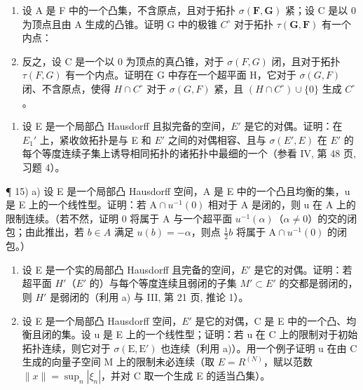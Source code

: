 \begin{enumerate}
\def\labelenumi{\alph{enumi})}
\item
  设 A 是 F 中的一个凸集，不含原点，且对于拓扑 \(\sigma(\mathbf{F}, \mathbf{G})\) 紧；设 C 是以 0 为顶点且由 A 生成的凸锥。证明 G 中的极锥 \(C^{\circ}\) 对于拓扑 \(\tau(\mathbf{G}, \mathbf{F})\) 有一个内点：
\item
  反之，设 C 是一个以 0 为顶点的真凸锥，对于 \(\sigma(F, G)\) 闭，且对于拓扑 \(\tau(F, G)\) 有一个内点。证明在 G 中存在一个超平面 H，它对于 \(\sigma(G, F)\) 闭、不含原点，使得 \(H \cap C^{\circ}\) 对于 \(\sigma(G, F)\) 紧，且 \((H \cap C^{\circ}) \cup \{0\}\) 生成 \(C^{\circ}\)。
\end{enumerate}

\begin{enumerate}
\def\labelenumi{\arabic{enumi})}
\setcounter{enumi}{13}
\tightlist
\item
  设 E 是一个局部凸 Hausdorff 且拟完备的空间，\(E'\) 是它的对偶。证明：在 \(E_{1}'\) 上，紧收敛拓扑是与 E 和 \(E'\) 之间的对偶相容、且与 \(\sigma(E', E)\) 在 \(E'\) 的每个等度连续子集上诱导相同拓扑的诸拓扑中最细的一个（参看 IV, 第 48 页, 习题 4）。
\end{enumerate}

¶ 15) a) 设 E 是一个局部凸 Hausdorff 空间，A 是 E 中的一个凸且均衡的集，u 是 E 上的一个线性型。证明：若 \(\mathrm{A} \cap u^{-1}(0)\) 相对于 A 是闭的，则 u 在 A 上的限制连续。（若不然，证明 0 将属于 A 与一个超平面 \(u^{-1}(\alpha)\)（\(\alpha \neq 0\)）的交的闭包；由此推出，若 \(b \in A\) 满足 \(u(b) = -\alpha\)，则点 \(\frac{1}{2}b\) 将属于 \(\mathrm{A} \cap u^{-1}(0)\) 的闭包。）

\begin{enumerate}
\def\labelenumi{\alph{enumi})}
\setcounter{enumi}{1}
\item
  设 E 是一个实的局部凸 Hausdorff 且完备的空间，\(E'\) 是它的对偶。证明：若超平面 \(H'\)（\(E'\) 的）与每个等度连续且弱闭的子集 \(M' \subset E'\) 的交都是弱闭的，则 \(H'\) 是弱闭的（利用 a) 与 III, 第 21 页, 推论 1）。
\item
  设 E 是一个局部凸 Hausdorff 空间，\(E'\) 是它的对偶，C 是 E 中的一个凸、均衡且闭的集。设 u 是 E 上的一个线性型；证明：若 u 在 C 上的限制对于初始拓扑连续，则它对于 \(\sigma(\mathrm{E}, \mathrm{E}')\) 也连续（利用 a)）。用一个例子证明 u 在由 C 生成的向量子空间 M 上的限制未必连续（取 \(E = R^{(N)}\)，赋以范数 \(\|x\| = \sup_{n} |\xi_{n}|\)，并对 C 取一个生成 E 的适当凸集）。
\end{enumerate}


